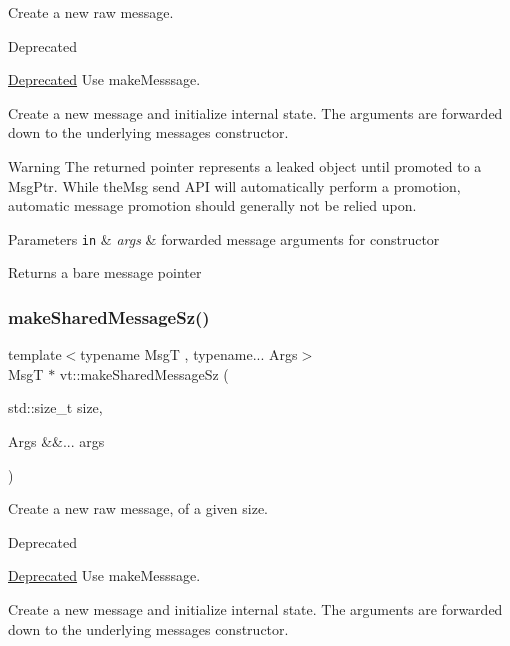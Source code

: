 Create a new \textquotesingle{}raw\textquotesingle{} message. 

\begin{DoxyRefDesc}{Deprecated}
\item[\hyperlink{deprecated__deprecated000007}{Deprecated}]Use {\ttfamily make\+Messsage}. \end{DoxyRefDesc}
Create a new message and initialize internal state. The arguments are forwarded down to the underlying message\textquotesingle{}s constructor.

\begin{DoxyWarning}{Warning}
The returned pointer represents a leaked object until \textquotesingle{}promoted\textquotesingle{} to a Msg\+Ptr. While {\ttfamily the\+Msg} send A\+PI will automatically perform a promotion, automatic message promotion should generally not be relied upon.
\end{DoxyWarning}

\begin{DoxyParams}[1]{Parameters}
\mbox{\tt in}  & {\em args} & forwarded message arguments for constructor\\
\hline
\end{DoxyParams}
\begin{DoxyReturn}{Returns}
a bare message pointer 
\end{DoxyReturn}
\mbox{\label{namespacevt_a1cad9543b26045826f0fa5d17a2dfd2f}} 
\subsubsection{\texorpdfstring{make\+Shared\+Message\+Sz()}{makeSharedMessageSz()}}
{\footnotesize\ttfamily template$<$typename MsgT , typename... Args$>$ \\
MsgT $\ast$ vt\+::make\+Shared\+Message\+Sz (\begin{DoxyParamCaption}\item[{std\+::size\+\_\+t}]{size,  }\item[{Args \&\&...}]{args }\end{DoxyParamCaption})}



Create a new \textquotesingle{}raw\textquotesingle{} message, of a given size. 

\begin{DoxyRefDesc}{Deprecated}
\item[\hyperlink{deprecated__deprecated000008}{Deprecated}]Use {\ttfamily make\+Messsage}. \end{DoxyRefDesc}
Create a new message and initialize internal state. The arguments are forwarded down to the underlying message\textquotesingle{}s constructor.

